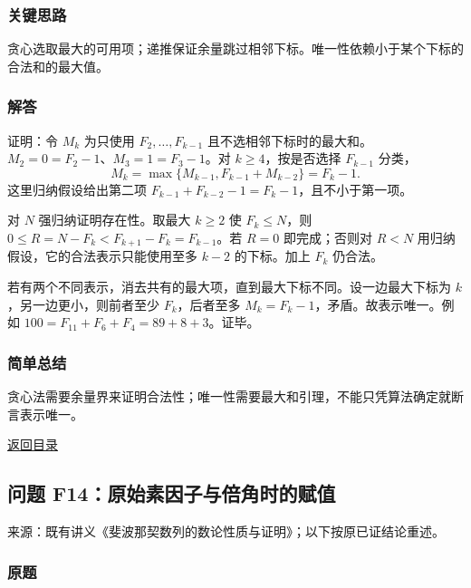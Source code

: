 \documentclass[11pt,a4paper]{article}
\begin{document}
\subsubsection{关键思路}\label{ux5173ux952eux601dux8def-45}

贪心选取最大的可用项；递推保证余量跳过相邻下标。唯一性依赖小于某个下标的合法和的最大值。

\subsubsection{解答}\label{ux89e3ux7b54-45}

证明：令 \(M_k\) 为只使用 \(F_2,\ldots,F_{k-1}\)
且不选相邻下标时的最大和。\(M_2=0=F_2-1\)、\(M_3=1=F_3-1\)。对
\(k\ge4\)，按是否选择 \(F_{k-1}\) 分类，
\[M_k=\max\{M_{k-1},F_{k-1}+M_{k-2}\}=F_k-1.\] 这里归纳假设给出第二项
\(F_{k-1}+F_{k-2}-1=F_k-1\)，且不小于第一项。

对 \(N\) 强归纳证明存在性。取最大 \(k\ge2\) 使 \(F_k\le N\)，则
\(0\le R=N-F_k<F_{k+1}-F_k=F_{k-1}\)。若 \(R=0\) 即完成；否则对 \(R<N\)
用归纳假设，它的合法表示只能使用至多 \(k-2\) 的下标。加上 \(F_k\)
仍合法。

若有两个不同表示，消去共有的最大项，直到最大下标不同。设一边最大下标为
\(k\)，另一边更小，则前者至少 \(F_k\)，后者至多
\(M_k=F_k-1\)，矛盾。故表示唯一。例如
\(100=F_{11}+F_6+F_4=89+8+3\)。证毕。

\subsubsection{简单总结}\label{ux7b80ux5355ux603bux7ed3-45}

贪心法需要余量界来证明合法性；唯一性需要最大和引理，不能只凭算法确定就断言表示唯一。

\noindent\hyperref[contents]{返回目录}

\subsection{问题
F14：原始素因子与倍角时的赋值}\label{ux95eeux9898-f14ux539fux59cbux7d20ux56e0ux5b50ux4e0eux500dux89d2ux65f6ux7684ux8d4bux503c}

来源：既有讲义《斐波那契数列的数论性质与证明》；以下按原已证结论重述。

\subsubsection{原题}\label{ux539fux9898-46}
\end{document}
